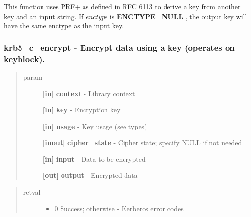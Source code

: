\documentclass[letterpaper,10pt,english]{sphinxmanual}
\begin{document}
This function uses PRF+ as defined in RFC 6113 to derive a key from another key and an input string. If \emph{enctype} is \textbf{ENCTYPE\_NULL} , the output key will have the same enctype as the input key.


\subsubsection{krb5\_c\_encrypt -  Encrypt data using a key (operates on keyblock).}
\label{appdev/refs/api/krb5_c_encrypt::doc}\label{appdev/refs/api/krb5_c_encrypt:krb5-c-encrypt-encrypt-data-using-a-key-operates-on-keyblock}

\begin{fulllineitems}
\label{appdev/refs/api/krb5_c_encrypt:c.krb5_c_encrypt}
\end{fulllineitems}

\begin{quote}\begin{description}
\item[{param}] \leavevmode
\textbf{{[}in{]}} \textbf{context} - Library context

\textbf{{[}in{]}} \textbf{key} - Encryption key

\textbf{{[}in{]}} \textbf{usage} - Key usage (see  types)

\textbf{{[}inout{]}} \textbf{cipher\_state} - Cipher state; specify NULL if not needed

\textbf{{[}in{]}} \textbf{input} - Data to be encrypted

\textbf{{[}out{]}} \textbf{output} - Encrypted data

\end{description}\end{quote}
\begin{quote}\begin{description}
\item[{retval}] \leavevmode\begin{itemize}
\item {} 
0   Success; otherwise - Kerberos error codes

\end{itemize}

\end{description}\end{quote}
\end{document}
